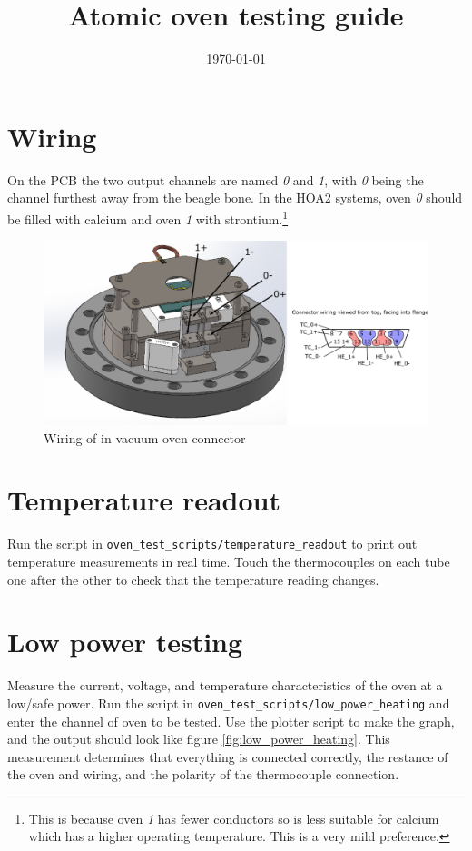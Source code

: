 \documentclass{article}
\begin{document}
\title{Atomic oven testing guide}
\date{\today}

\maketitle

\section{Wiring}

On the PCB the two output channels are named \textit{0} and \textit{1}, with \textit{0} being the channel furthest away from the beagle bone. In the HOA2 systems, oven \textit{0} should be filled with calcium and oven \textit{1} with strontium.\footnote{This is because oven \textit{1} has fewer conductors so is less suitable for calcium which has a higher operating temperature. This is a very mild preference.}

\begin{figure}[H]
    \center
    \includegraphics[scale=1]{figures/baseflange_wiring.pdf} 
    \caption{Wiring of in vacuum oven connector}
    \label{fig:baseflange_wiring}
\end{figure}

\section{Temperature readout}
Run the script in \texttt{oven\_test\_scripts/temperature\_readout} to print out temperature measurements in real time. Touch the thermocouples on each tube one after the other to check that the temperature reading changes.

\clearpage
\section{Low power testing}
Measure the current, voltage, and temperature characteristics of the oven at a low/safe power. Run the script in \texttt{oven\_test\_scripts/low\_power\_heating} and enter the channel of oven to be tested. Use the plotter script to make the graph, and the output should look like figure \ref{fig:low_power_heating}.
This measurement determines that everything is connected correctly, the restance of the oven and wiring, and the polarity of the thermocouple connection.
\end{document}
